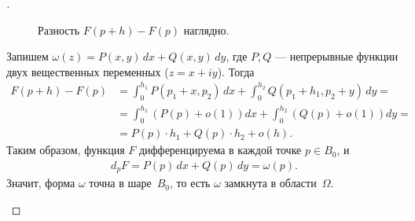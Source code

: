 \documentclass[../complex-analysis.tex]{subfiles}
\begin{document}
\begin{proof}[]
\begin{itemize}
   \begin{figure}[ht]
    \centering
    \caption{Разность $ F(p+h) - F(p) $ наглядно.}
    \label{fig:differential_of_parallel_path_f}
   \end{figure}

   Запишем  $ \omega(z) = P(x,y)\,dx + Q(x,y)\,dy $, где  $ P,Q $ --- непрерывные функции двух вещественных переменных ($ z = x+iy $). Тогда
   \begin{align*}
    F(p+h)-F(p) &= \int_{0}^{h_1} P(p_1 + x, p_2)\,dx + \int_{0}^{h_2} Q(p_1 + h_1, p_2 + y)\,dy = \\
    &= \int_{0}^{h_1} \left( P(p) + o(1) \right)dx + \int_{0}^{h_2} \left( Q(p) + o(1) \right)dy = \\
    &= P(p) \cdot h_1 + Q(p) \cdot h_2 + o(h).
   \end{align*} Таким образом, функция $ F $ дифференцируема в каждой точке $ p \in B_0 $, и
   \begin{align*}
    d_p F = P(p)\,dx + Q(p)\,dy = \omega(p).
   \end{align*} Значит, форма $ \omega $ точна в шаре~$ B_0 $, то есть $ \omega $ замкнута в области~$ \Omega $.
 \end{itemize}
\end{proof}
\end{document}
